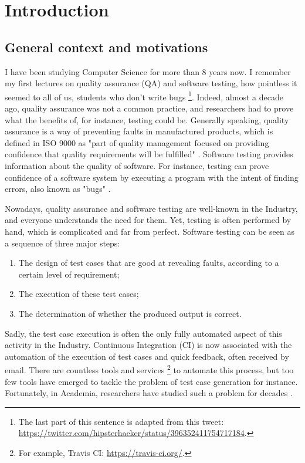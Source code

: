 %
\chapter{Introduction}
\label{sec:intro}

\minitoc

\section{General context and motivations}

I have been studying Computer Science for more than 8 years now.
I remember my first lectures on quality assurance (QA) and
software testing, how pointless it seemed to all of us, students
who don't write bugs \footnote{The last part of this sentence is
adapted from this tweet:
\url{https://twitter.com/hipsterhacker/status/396352411754717184}.}.
Indeed, almost a decade ago, quality assurance was not a common
practice, and researchers had to prove what the benefits of, for
instance, testing could be. Generally speaking, quality assurance
is a way of preventing faults in manufactured products, which is
defined in ISO 9000 as "part of quality management focused on
providing confidence that quality requirements will be fulfilled"
\cite{iso20059000}. Software testing provides information about
the quality of software. For instance, testing can prove
confidence of a software system by executing a program with the
intent of finding errors, also known as "bugs"
\cite{Myers:1979:AST:539883}.

Nowadays, quality assurance and software testing are well-known
in the Industry, and everyone understands the need for them.
Yet, testing is often performed by hand, which is complicated
and far from perfect. Software testing can be seen as a sequence
of three major steps:

\begin{enumerate}
    \item The design of test cases that are good at revealing
        faults, according to a certain level of requirement;

    \item The execution of these test cases;

    \item The determination of whether the produced output is
        correct.
\end{enumerate}

Sadly, the test case execution is often the only fully automated
aspect of this activity in the Industry. Continuous Integration
(CI) \cite{booch1991object} is now associated with the automation
of the execution of test cases and quick feedback, often received
by email. There are countless tools and services
\footnote{For example, Travis CI: \url{https://travis-ci.org/}.}
to automate this process, but too few tools have emerged to
tackle the problem of test case generation for instance.
Fortunately, in Academia, researchers have studied such a problem
for decades \cite{4221614}.


